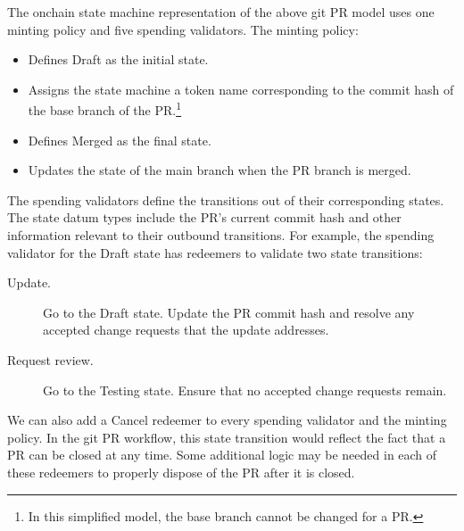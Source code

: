 \documentclass[../midgard.tex]{subfiles}
\begin{document}
The onchain state machine representation of the above git PR model uses one minting policy and five spending validators. The minting policy:

\begin{itemize}
    \item Defines Draft as the initial state.
    \item Assigns the state machine a token name corresponding to the commit hash of the base branch of the PR.\footnote{In this simplified model, the base branch cannot be changed for a PR.}
    \item Defines Merged as the final state.
    \item Updates the state of the main branch when the PR branch is merged.
\end{itemize}

The spending validators define the transitions out of their corresponding states. The state datum types include the PR's current commit hash and other information relevant to their outbound transitions. For example, the spending validator for the Draft state has redeemers to validate two state transitions:
\begin{description}
    \item[Update.] Go to the Draft state. Update the PR commit hash and resolve any accepted change requests that the update addresses.
    \item[Request review.] Go to the Testing state. Ensure that no accepted change requests remain.
\end{description}

We can also add a Cancel redeemer to every spending validator and the minting policy. In the git PR workflow, this state transition would reflect the fact that a PR can be closed at any time. Some additional logic may be needed in each of these redeemers to properly dispose of the PR after it is closed.
\end{document}

